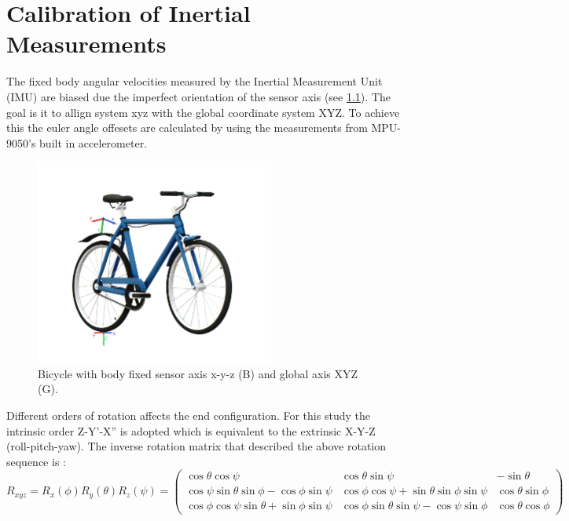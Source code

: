
\chapter{Calibration of Inertial Measurements} \label{app:A}

The fixed body angular velocities measured by the Inertial Measurement Unit (IMU) are biased due the imperfect orientation of the sensor axis (see \cref{fig:bike_imu}). The goal is  it to allign system xyz with the global coordinate system XYZ. To achieve this the euler angle offesets are calculated by using the measurements from MPU-9050's built in accelerometer. 

\begin{figure}[ht]
    \centering
    \includegraphics[width=0.7\textwidth]{images/whipple_axis.png}
    \caption{Bicycle with body fixed sensor axis x-y-z (B) and global axis XYZ (G). }
    \label{fig:bike_imu}
\end{figure}

Different orders of rotation affects the end configuration. For this study the intrinsic order Z-Y'-X'' is adopted which is equivalent to the extrinsic X-Y-Z (roll-pitch-yaw). The inverse rotation matrix that described the above rotation sequence is :
\begin{equation}
R_{xyz}=R_x(\phi)R_y(\theta)R_z(\psi)=\left(\begin{array}{ccc}{\cos \theta \cos \psi} & {\cos \theta \sin \psi} & {-\sin \theta} \\ {\cos \psi \sin \theta \sin \phi-\cos \phi \sin \psi} & {\cos \phi \cos \psi+\sin \theta \sin \phi \sin \psi} & {\cos \theta \sin \phi} \\ {\cos \phi \cos \psi \sin \theta+\sin \phi \sin \psi} & {\cos \phi \sin \theta \sin \psi-\cos \psi \sin \phi} & {\cos \theta \cos \phi}\end{array}\right)
    \label{eq:rotmat}
\end{equation}

